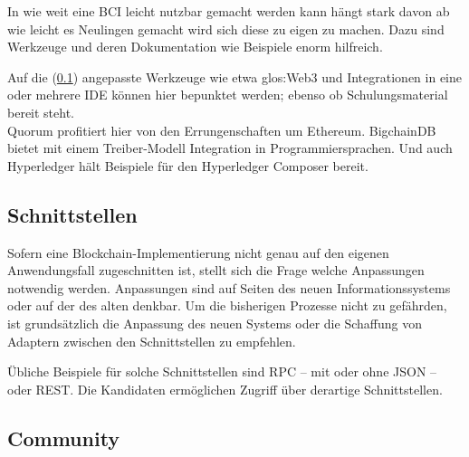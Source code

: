 \label{krit:werkzeuge}

In wie weit eine \gls{BCI} leicht nutzbar gemacht werden kann hängt stark davon ab wie leicht es Neulingen gemacht wird sich diese zu eigen zu machen.
Dazu sind Werkzeuge und deren Dokumentation wie Beispiele enorm hilfreich.

Auf die  (\ref{krit:schnittstellen}) angepasste Werkzeuge wie etwa \gls{glos:Web3} und Integrationen in eine oder mehrere \gls{IDE} können hier bepunktet werden; ebenso ob Schulungsmaterial bereit steht. \\
Quorum profitiert hier von den Errungenschaften um Ethereum.
BigchainDB bietet mit einem Treiber-Modell Integration in Programmiersprachen.
Und auch Hyperledger hält Beispiele für den Hyperledger Composer bereit.


\subsection{Schnittstellen}\label{krit:schnittstellen}

Sofern eine Blockchain-Implementierung nicht genau auf den eigenen Anwendungsfall zugeschnitten ist, stellt sich die Frage welche Anpassungen notwendig werden.
Anpassungen sind auf Seiten des neuen Informationssystems oder auf der des alten denkbar.
Um die bisherigen Prozesse nicht zu gefährden, ist grundsätzlich die Anpassung des neuen Systems oder die Schaffung von Adaptern zwischen den Schnittstellen zu empfehlen.

Übliche Beispiele für solche Schnittstellen sind \gls{RPC} -- mit oder ohne \gls{JSON} -- oder \gls{REST}.
Die Kandidaten ermöglichen Zugriff über derartige Schnittstellen.



\subsection{Community}\label{krit:community}

